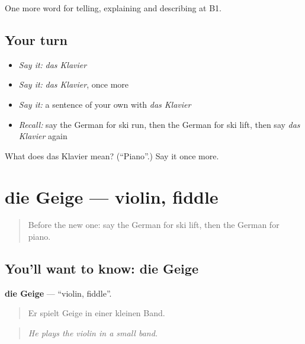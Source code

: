 \begin{grammarlens}[title={What you've built}]
One more word for telling, explaining and describing at B1.
\end{grammarlens}

\subsection*{Your turn}
\begin{itemize}
\raggedright
  \item \emph{Say it:} \emph{das Klavier}
  \item \emph{Say it:} \emph{das Klavier}, once more
  \item \emph{Say it:} a sentence of your own with \emph{das Klavier}
  \item \emph{Recall:} say the German for ski run, then the German for ski lift, then say \emph{das Klavier} again
\end{itemize}

\begin{tcolorbox}[breakable,colback=teal!4,colframe=teal!35!black,title={Before you move on}]
What does das Klavier mean? (\textquotedblleft{}Piano\textquotedblright{}.) Say it once more.
\end{tcolorbox}
\section[die Geige]{die Geige — violin, fiddle}

\label{lesson:GE-C513-geige}



\begin{quote}
Before the new one: say the German for ski lift, then the German for piano.
\end{quote}

\subsection*{You'll want to know: die Geige}
\textbf{die Geige} — \textquotedblleft{}violin, fiddle\textquotedblright{}.

\begin{quote}
Er spielt Geige in einer kleinen Band.
\end{quote}

\begin{quote}
\emph{He plays the violin in a small band.}
\end{quote}

